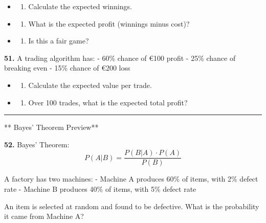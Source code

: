 \documentclass[
  11pt,
]{article}
\providecommand{\tightlist}{%
  \setlength{\itemsep}{0pt}\setlength{\parskip}{0pt}}
\begin{document}
\begin{itemize}
\item
  \begin{enumerate}
  \def\labelenumi{(\alph{enumi})}
  \tightlist
  \item
    Calculate the expected winnings.
  \end{enumerate}
\item
  \begin{enumerate}
  \def\labelenumi{(\alph{enumi})}
  \setcounter{enumi}{1}
  \tightlist
  \item
    What is the expected profit (winnings minus cost)?
  \end{enumerate}
\item
  \begin{enumerate}
  \def\labelenumi{(\alph{enumi})}
  \setcounter{enumi}{2}
  \tightlist
  \item
    Is this a fair game?
  \end{enumerate}
\end{itemize}

\textbf{51.} A trading algorithm has: - 60\% chance of €100 profit -
25\% chance of breaking even - 15\% chance of €200 loss

\begin{itemize}
\item
  \begin{enumerate}
  \def\labelenumi{(\alph{enumi})}
  \tightlist
  \item
    Calculate the expected value per trade.
  \end{enumerate}
\item
  \begin{enumerate}
  \def\labelenumi{(\alph{enumi})}
  \setcounter{enumi}{1}
  \tightlist
  \item
    Over 100 trades, what is the expected total profit?
  \end{enumerate}
\end{itemize}

\begin{center}\rule{0.5\linewidth}{0.5pt}\end{center}

** Bayes' Theorem Preview**

\textbf{52.} Bayes' Theorem: \[P(A|B) = \frac{P(B|A) \cdot P(A)}{P(B)}\]

A factory has two machines: - Machine A produces 60\% of items, with 2\%
defect rate - Machine B produces 40\% of items, with 5\% defect rate

An item is selected at random and found to be defective. What is the
probability it came from Machine A?
\end{document}
